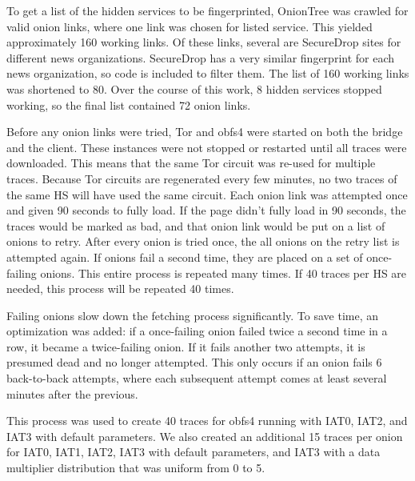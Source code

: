 \documentclass[11pt]{article}
\begin{document}
To get a list of the hidden services to be fingerprinted, OnionTree was crawled for valid onion links, where one link was chosen for listed service. This yielded approximately 160 working links. Of these links, several are SecureDrop sites for different news organizations. SecureDrop has a very similar fingerprint for each news organization, so code is included to filter them. The list of 160 working links was shortened to 80. Over the course of this work, 8 hidden services stopped working, so the final list contained 72 onion links.

Before any onion links were tried, Tor and obfs4 were started on both the bridge and the client. These instances were not stopped or restarted until all traces were downloaded. This means that the same Tor circuit was re-used for multiple traces. Because Tor circuits are regenerated every few minutes, no two traces of the same HS will have used the same circuit. Each onion link was attempted once and given 90 seconds to fully load. If the page didn't fully load in 90 seconds, the traces would be marked as bad, and that onion link would be put on a list of onions to retry. After every onion is tried once, the all onions on the retry list is attempted again. If onions fail a second time, they are placed on a set of once-failing onions. This entire process is repeated many times. If 40 traces per HS are needed, this process will be repeated 40 times.

Failing onions slow down the fetching process significantly. To save time, an optimization was added: if a once-failing onion failed twice a second time in a row, it became a twice-failing onion. If it fails another two attempts, it is presumed dead and no longer attempted. This only occurs if an onion fails 6 back-to-back attempts, where each subsequent attempt comes at least several minutes after the previous.

This process was used to create 40 traces for obfs4 running with IAT0, IAT2, and IAT3 with default parameters. We also created an additional 15 traces per onion for IAT0, IAT1, IAT2, IAT3 with default parameters, and IAT3 with a data multiplier distribution that was uniform from 0 to 5.
\end{document}
